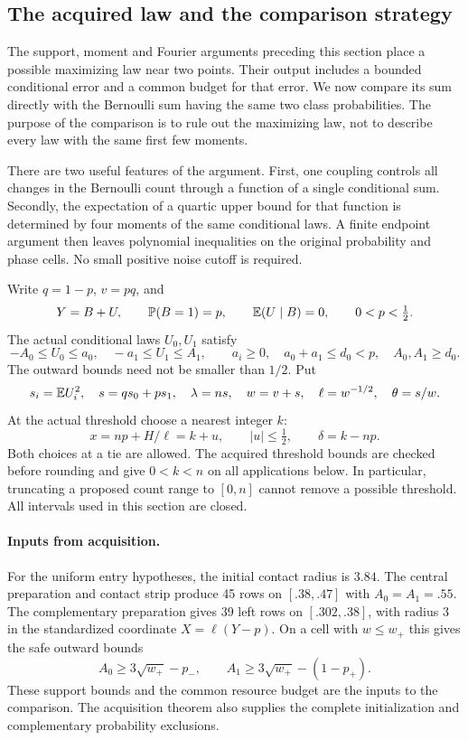 \subsection{The acquired law and the comparison strategy}
\label{dc:entry}

The support, moment and Fourier arguments preceding this section place a
possible maximizing law near two points. Their output includes a bounded
conditional error and a common budget for that error. We now compare its
sum directly with the Bernoulli sum having the same two class probabilities.
The purpose of the comparison is to rule out the maximizing law, not to
describe every law with the same first few moments.

There are two useful features of the argument. First, one coupling controls
all changes in the Bernoulli count through a function of a single conditional
sum. Secondly, the expectation of a quartic upper bound for that function
is determined by four moments of the same conditional laws. A finite
endpoint argument then leaves polynomial inequalities on the original
probability and phase cells. No small positive noise cutoff is required.

Write $q=1-p$, $v=pq$, and
\[
 Y=B+U,\qquad \mathbb P(B=1)=p,\qquad \mathbb E(U\mid B)=0,
 \qquad 0<p<\tfrac12.
\]
The actual conditional laws $U_0,U_1$ satisfy
\begin{equation}\label{dc:support}
 -A_0\le U_0\le a_0,\quad -a_1\le U_1\le A_1,\qquad
 a_i\ge0,\quad a_0+a_1\le d_0<p,\quad A_0,A_1\ge d_0.
\end{equation}
The outward bounds need not be smaller than $1/2$. Put
\[
 s_i=\mathbb E U_i^2,\quad s=qs_0+ps_1,\quad \lambda=ns,
 \quad w=v+s,\quad \ell=w^{-1/2},\quad \theta=s/w.
\]
At the actual threshold choose a nearest integer $k$:
\[
 x=np+H/\ell=k+u,\qquad |u|\le\tfrac12,\qquad \delta=k-np.
\]
Both choices at a tie are allowed. The acquired threshold bounds are
checked before rounding and give $0<k<n$ on all applications below.
In particular, truncating a proposed count range to $[0,n]$ cannot remove
a possible threshold. All intervals used in this section are closed.

\paragraph{Inputs from acquisition.}
For the uniform entry hypotheses, the initial contact radius is $3.84$.
The central preparation and contact strip produce 45 rows on
$[.38,.47]$ with $A_0=A_1=.55$. The complementary preparation gives
39 left rows on $[.302,.38]$, with radius $3$ in the standardized
coordinate $X=\ell(Y-p)$. On a cell with $w\le w_+$ this gives the safe
outward bounds
\[
 A_0\ge3\sqrt{w_+}-p_-,\qquad
 A_1\ge3\sqrt{w_+}-(1-p_+).
\]
These support bounds and the common resource budget are the inputs to
the comparison. The acquisition theorem also supplies the complete
initialization and complementary probability exclusions.

